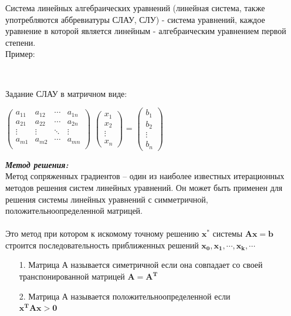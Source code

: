 \documentclass[12pt]{article}
\begin{document}
\Large Система линейных алгебраических уравнений (линейная система, 
также употребляются аббревиатуры СЛАУ, СЛУ) - система
уравнений, каждое уравнение в которой является линейным - 
алгебраическим уравнением первой степени.\\
Пример: 
\begin{center}
\\
\end{center}
Задание СЛАУ в матричном виде:
\begin{center}
	\(
  	\left( {\begin{array}{cccc}
    a_{11} & a_{12} & \cdots & a_{1n}\\
    a_{21} & a_{22} & \cdots & a_{2n}\\
    \vdots & \vdots & \ddots & \vdots\\
    a_{m1} & a_{m2} & \cdots & a_{mn}\\
  	\end{array} } \right)
	\)
  	$\begin{pmatrix}
  	x_1\\
  	x_2\\
  	\vdots\\
  	x_n
  	\end{pmatrix}$
  	=
  	$\begin{pmatrix}
  	b_1\\
  	b_2\\
  	\vdots\\
  	b_n
  	\end{pmatrix}$
\end{center}
\textbf{\emph{Метод решения:}}
\\Метод сопряженных градиентов – один из наиболее известных итерационных методов решения систем линейных уравнений. Он может быть применен для решения системы линейных уравнений с симметричной, положительноопределенной матрицей.\\\\
Это метод при котором к искомому точному решению $\mathbf{x^*}$ системы $\mathbf{Ax = b}$ строится последовательность приближенных решений $\mathbf{x_0, x_1 , \cdots , x_k , \cdots}$
\\
\begin{itemize}
	\item[1.] Матрица А называется симетричной если она совпадает со своей транспонированной матрицей $\mathbf{A = A^T}$
	\item[2.] Матрица А называется положительноопределенной если\\ $\mathbf{x^TAx > 0}$
\end{itemize}
\end{document}
